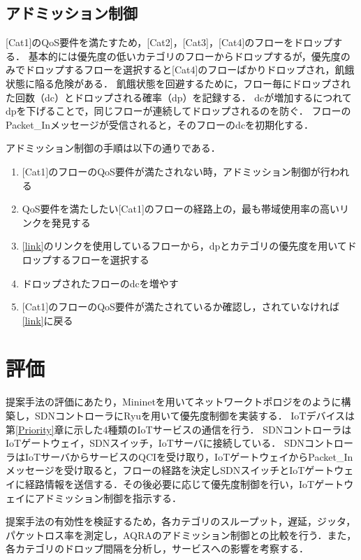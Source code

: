 \documentclass[a4paper,10pt,twocolumn,uplatex]{jsarticle}
\begin{document}
\subsection{アドミッション制御}
[Cat1]のQoS要件を満たすため，[Cat2]，[Cat3]，[Cat4]のフローをドロップする．
基本的には優先度の低いカテゴリのフローからドロップするが，優先度のみでドロップするフローを選択すると[Cat4]のフローばかりドロップされ，飢餓状態に陥る危険がある．
飢餓状態を回避するために，フロー毎にドロップされた回数（dc）とドロップされる確率（dp）を記録する．
dcが増加するにつれてdpを下げることで，同じフローが連続してドロップされるのを防ぐ．
フローのPacket\_Inメッセージが受信されると，そのフローのdcを初期化する．\par
アドミッション制御の手順は以下の通りである．

\begin{enumerate}
  \item $[$Cat1$]$のフローのQoS要件が満たされない時，アドミッション制御が行われる
  \item QoS要件を満たしたい[Cat1]のフローの経路上の，最も帯域使用率の高いリンクを発見する\label{link}
  \item \ref{link}のリンクを使用しているフローから，dpとカテゴリの優先度を用いてドロップするフローを選択する
  \item ドロップされたフローのdcを増やす
  \item $[$Cat1$]$のフローのQoS要件が満たされているか確認し，されていなければ\ref{link}に戻る
\end{enumerate}

\section{評価}
提案手法の評価にあたり，Mininetを用いてネットワークトポロジをのように構築し，SDNコントローラにRyuを用いて優先度制御を実装する．
IoTデバイスは第\ref{Priority}章に示した4種類のIoTサービスの通信を行う．
SDNコントローラはIoTゲートウェイ，SDNスイッチ，IoTサーバに接続している．
SDNコントローラはIoTサーバからサービスのQCIを受け取り，IoTゲートウェイからPacket\_Inメッセージを受け取ると，フローの経路を決定しSDNスイッチとIoTゲートウェイに経路情報を送信する．その後必要に応じて優先度制御を行い，IoTゲートウェイにアドミッション制御を指示する．\par
提案手法の有効性を検証するため，各カテゴリのスループット，遅延，ジッタ，パケットロス率を測定し，AQRAのアドミッション制御との比較を行う．また，各カテゴリのドロップ間隔を分析し，サービスへの影響を考察する．\par
\end{document}
